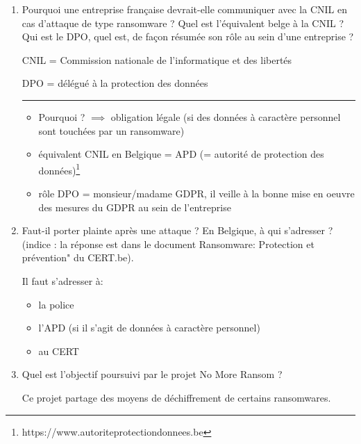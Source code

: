 \documentclass[a4paper]{article}
\begin{document}
\begin{enumerate}
\item Pourquoi une entreprise française devrait-elle communiquer avec la CNIL en cas d'attaque de type ransomware ? Quel est l'équivalent belge à la CNIL ? Qui est le DPO, quel est, de façon résumée son rôle au sein d'une entreprise ?
\begin{example}
    CNIL = Commission nationale de l'informatique et des libertés

    DPO = délégué à la protection des données

    \begin{center} \rule{0.99\linewidth}{0.1mm} \end{center}

    \begin{itemize}
        \item Pourquoi ? $ \implies $ obligation légale (si des données à caractère personnel sont touchées par un ransomware)
        \item équivalent CNIL en Belgique = APD (= autorité de protection des données)\footnote{https://www.autoriteprotectiondonnees.be}
        \item rôle DPO = monsieur/madame GDPR, il veille à la bonne mise en oeuvre des mesures du GDPR au sein de l'entreprise
    \end{itemize}
\end{example}



\item Faut-il porter plainte après une attaque ? En Belgique, à qui s'adresser ? (indice : la réponse est dans le document Ransomware: Protection et prévention" du CERT.be).
\begin{example}
    Il faut s'adresser à:
    \begin{itemize}
        \item la police
        \item l'APD (si il s'agit de données à caractère personnel)
        \item au CERT
    \end{itemize}
\end{example}



\item Quel est l'objectif poursuivi par le projet No More Ransom ?
\begin{example}
    Ce projet partage des moyens de déchiffrement de certains ransomwares.
\end{example}



\end{enumerate}
\end{document}
